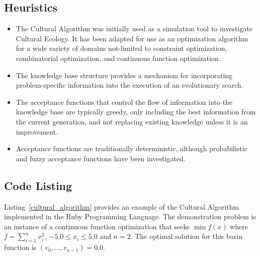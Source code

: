 \subsection{Heuristics}
\begin{itemize}
	\item The Cultural Algorithm was initially used as a simulation tool to investigate Cultural Ecology. It has been adapted for use as an optimization algorithm for a wide variety of domains not-limited to constraint optimization, combinatorial optimization, and continuous function optimization.
	\item The knowledge base structure provides a mechanism for incorporating problem-specific information into the execution of an evolutionary search.
	\item The acceptance functions that control the flow of information into the knowledge base are typically greedy, only including the best information from the current generation, and not replacing existing knowledge unless it is an improvement.
	\item Acceptance functions are traditionally deterministic, although probabilistic and fuzzy acceptance functions have been investigated.
\end{itemize}

\subsection{Code Listing}
Listing~\ref{cultural_algorithm} provides an example of the Cultural Algorithm implemented in the Ruby Programming Language. 
The demonstration problem is an instance of a continuous function optimization that seeks $\min f(x)$ where $f=\sum_{i=1}^n x_{i}^2$, $-5.0\leq x_i \leq 5.0$ and $n=2$. The optimal solution for this basin function is $(v_0,\ldots,v_{n-1})=0.0$.

